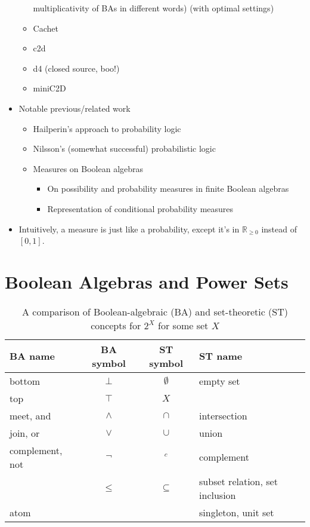 \documentclass{article}
\theoremstyle{definition}
\theoremstyle{remark}
\begin{document}
\begin{itemize}
\begin{itemize}
    multiplicativity of BAs in different words) (with optimal settings)
  \item Cachet \cite{DBLP:conf/sat/SangBBKP04}
  \item c2d \cite{DBLP:conf/ecai/Darwiche04}
  \item d4 \cite{DBLP:conf/ijcai/LagniezM17} (closed source, boo!)
  \item miniC2D  \cite{DBLP:conf/ijcai/OztokD15}
  \end{itemize}
\item Notable previous/related work
  \begin{itemize}
  \item Hailperin's approach to probability logic
    \cite{DBLP:journals/ndjfl/Hailperin84}
  \item Nilsson's (somewhat successful) probabilistic logic
    \cite{DBLP:journals/ai/Nilsson86,DBLP:journals/ai/Nilsson93}
  \item Measures on Boolean algebras
    \begin{itemize}
    \item On possibility and probability measures in finite Boolean algebras
      \cite{DBLP:journals/soco/CastineiraCT02}
    \item Representation of conditional probability measures
      \cite{krauss1968representation}
    \end{itemize}
  \end{itemize}
\item Intuitively, a measure is just like a probability, except it's in
  $\mathbb{R}_{\ge 0}$ instead of $[0, 1]$.
\end{itemize}

\section{Boolean Algebras and Power Sets}

\begin{table}
  \centering
  \caption{A comparison of Boolean-algebraic (BA) and set-theoretic (ST)
    concepts for $2^X$ for some set $X$}
  \label{tbl:notation}
  \begin{tabular}{lccl}
    \toprule
    BA name & BA symbol & ST symbol & ST name \\
    \midrule
    bottom & $\bot$ & $\emptyset$ & empty set \\
    top & $\top$ & $X$ & \\
    meet, and & $\land$ & $\cap$ & intersection \\
    join, or & $\lor$ & $\cup$ & union \\
    complement, not & $\neg$ & $^c$ & complement \\
            & $\le$ & $\subseteq$ & subset relation, set inclusion \\
    atom & & & singleton, unit set \\
    \bottomrule
  \end{tabular}
\end{table}
\end{document}
